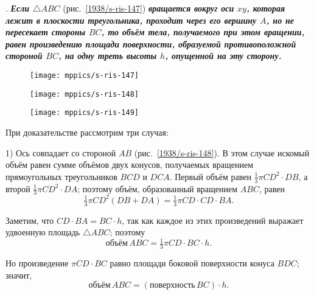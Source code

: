\medskip

\mbox{.}
\textbf{\emph{Если $\triangle ABC$}} (рис.~\ref{1938/s-ris-147}) \textbf{\emph{вращается вокруг оси $xy$, которая лежит в плоскости треугольника, проходит через его вершину $A$, но не пересекает стороны $BC$, то объём тела, получаемого при этом вращении, равен произведению площади поверхности, образуемой противоположной стороной $BC$, на одну треть высоты $h$, опущенной на эту сторону.}}

\begin{figure}[!ht]
\begin{minipage}{.32\textwidth}
\centering
\texttt{[image: mppics/s-ris-147]}
\end{minipage}
\hfill
\begin{minipage}{.32\textwidth}
\centering
\texttt{[image: mppics/s-ris-148]}
\end{minipage}
\hfill
\begin{minipage}{.32\textwidth}
\centering
\texttt{[image: mppics/s-ris-149]}
\end{minipage}

\medskip

\begin{minipage}{.32\textwidth}
\centering
\caption{}\label{1938/s-ris-147}
\end{minipage}
\hfill
\begin{minipage}{.32\textwidth}
\centering
\caption{}\label{1938/s-ris-148}
\end{minipage}
\hfill
\begin{minipage}{.32\textwidth}
\centering
\caption{}\label{1938/s-ris-149}
\end{minipage}
\vskip-4mm
\end{figure}

При доказательстве рассмотрим три случая:

1) Ось совпадает со стороной $AB$ (рис.~\ref{1938/s-ris-148}).
В этом случае искомый объём равен сумме объёмов двух конусов, получаемых вращением прямоугольных треугольников $BCD$ и $DCA$.
Первый объём равен $\tfrac13 \pi CD^2\cdot DB$, а второй $\tfrac13\pi CD^2\cdot DA$;
поэтому объём, образованный вращением $ABC$, равен 
\[\tfrac13\pi CD^2(DB + DA) = \tfrac13\pi CD\cdot CD\cdot BA.\]

Заметим, что $CD\cdot BA=BC\cdot h$, так как каждое из этих произведений выражает удвоенную площадь $\triangle ABC$;
поэтому
\[\text{объём}\, ABC = \tfrac13\pi CD\cdot BC\cdot h.\]

Но произведение $\pi CD\cdot BC$ равно площади боковой поверхности конуса $BDC$;
значит,
\[\text{объём}\, ABC = (\text{поверхность}\, BC)\cdot h.\]

